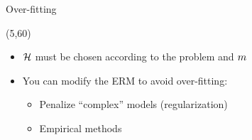 \begin{frame}{Over-fitting}
\begin{textblock}{50}
\begin{center}
{      }
    \end{center}
  \end{textblock}

  \begin{textblock}{90}(5,60)
    \begin{itemize}
    \item $\mathcal{H}$ must be chosen according to the problem and
      $m$
    \item You can modify the \ac{ERM} to avoid over-fitting:
      \begin{itemize}
      \item Penalize ``complex'' models (regularization)
      \item Empirical methods
      \end{itemize}
    \end{itemize}
  \end{textblock}
\end{frame}
